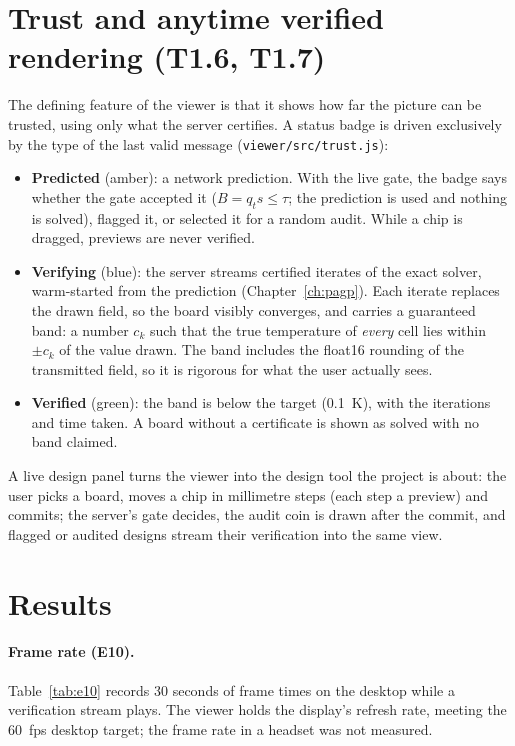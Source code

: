 \section{Trust and anytime verified rendering (T1.6, T1.7)}
The defining feature of the viewer is that it shows how far the picture can be trusted, using only
what the server certifies. A status badge is driven exclusively by the type of the last valid
message (\texttt{viewer/src/trust.js}):
\begin{itemize}
\item \textbf{Predicted} (amber): a network prediction. With the live gate, the badge says whether
the gate accepted it ($B = q_t s \le \tau$; the prediction is used and nothing is solved), flagged
it, or selected it for a random audit. While a chip is dragged, previews are never verified.
\item \textbf{Verifying} (blue): the server streams certified iterates of the exact solver,
warm-started from the prediction (Chapter~\ref{ch:pagp}). Each iterate replaces the drawn field,
so the board visibly converges, and carries a guaranteed band: a number $c_k$ such that the true
temperature of \emph{every} cell lies within $\pm c_k$ of the value drawn. The band includes the
float16 rounding of the transmitted field, so it is rigorous for what the user actually sees.
\item \textbf{Verified} (green): the band is below the target (0.1~K), with the iterations and
time taken. A board without a certificate is shown as solved with no band claimed.
\end{itemize}
A live design panel turns the viewer into the design tool the project is about: the user picks a
board, moves a chip in millimetre steps (each step a preview) and commits; the server's gate
decides, the audit coin is drawn after the commit, and flagged or audited designs stream their
verification into the same view.

\section{Results}
\paragraph{Frame rate (E10).} Table~\ref{tab:e10} records 30 seconds of frame times on the
desktop while a verification stream plays. The viewer holds the display's refresh rate, meeting
the 60~fps desktop target; the frame rate in a headset was not measured.

